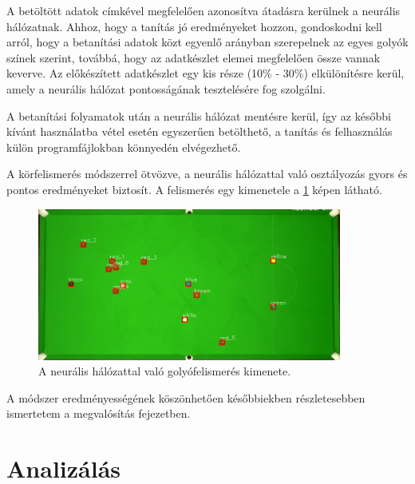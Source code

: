 \par A betöltött adatok címkével megfelelően azonosítva átadásra kerülnek a neurális hálózatnak. Ahhoz, hogy a tanítás jó eredményeket hozzon, gondoskodni kell arról, hogy a betanítási adatok közt egyenlő arányban szerepelnek az egyes golyók színek szerint, továbbá, hogy az adatkészlet elemei megfelelően össze vannak keverve. Az előkészített adatkészlet egy kis része (10\% - 30\%) elkülönítésre kerül, amely a neurális hálózat pontosságának tesztelésére fog szolgálni.
\par A betanítási folyamatok után a neurális hálózat mentésre kerül, így az későbbi kívánt használatba vétel esetén egyszerűen betölthető, a tanítás és felhasználás külön programfájlokban könnyedén elvégezhető.
\par A körfelismerés módszerrel ötvözve, a neurális hálózattal való osztályozás gyors és pontos eredményeket biztosít. A felismerés egy kimenetele a \ref{fig:felismert_asztal} képen látható.

\begin{figure}[!ht]
    \centering
    \includegraphics[width=100mm, keepaspectratio]{figures/recognised_table.png}
    \caption{A neurális hálózattal való golyófelismerés kimenete.}
    \label{fig:felismert_asztal}
\end{figure}

\par A módszer eredményességének köszönhetően későbbiekben részletesebben ismertetem a megvalósítás fejezetben.

\section{Analizálás}